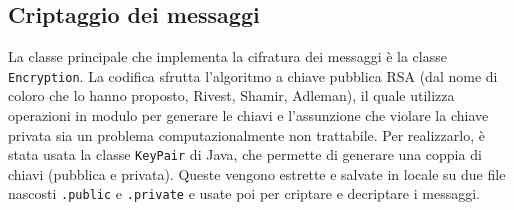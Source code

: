 \subsection{Criptaggio dei messaggi}
La classe principale che implementa la cifratura dei messaggi è la classe \texttt{Encryption}.
La codifica sfrutta l'algoritmo a chiave pubblica RSA (dal nome di coloro che
lo hanno proposto, Rivest, Shamir, Adleman), il quale utilizza operazioni in modulo per generare
le chiavi e l'assunzione che violare la chiave privata sia un problema computazionalmente non
trattabile. Per realizzarlo, è stata usata la classe \texttt{KeyPair} di Java, che permette di
generare una coppia di chiavi (pubblica e privata). Queste vengono estrette e salvate in locale su
due file nascosti \texttt{.public} e \texttt{.private} e usate poi per criptare e decriptare i messaggi.
